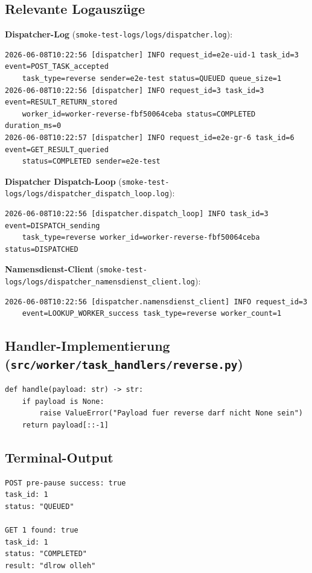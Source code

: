 \documentclass[a4paper,12pt]{article}
\begin{document}
\subsection*{Relevante Logauszüge}

\textbf{Dispatcher-Log} (\texttt{smoke-test-logs/logs/dispatcher.log}):
\begin{lstlisting}[style=log]
2026-06-08T10:22:56 [dispatcher] INFO request_id=e2e-uid-1 task_id=3 event=POST_TASK_accepted
    task_type=reverse sender=e2e-test status=QUEUED queue_size=1
2026-06-08T10:22:56 [dispatcher] INFO request_id=3 task_id=3 event=RESULT_RETURN_stored
    worker_id=worker-reverse-fbf50064ceba status=COMPLETED duration_ms=0
2026-06-08T10:22:57 [dispatcher] INFO request_id=e2e-gr-6 task_id=6 event=GET_RESULT_queried
    status=COMPLETED sender=e2e-test
\end{lstlisting}

\textbf{Dispatcher Dispatch-Loop} (\texttt{smoke-test-logs/logs/dispatcher\_dispatch\_loop.log}):
\begin{lstlisting}[style=log]
2026-06-08T10:22:56 [dispatcher.dispatch_loop] INFO task_id=3 event=DISPATCH_sending
    task_type=reverse worker_id=worker-reverse-fbf50064ceba status=DISPATCHED
\end{lstlisting}

\textbf{Namensdienst-Client} (\texttt{smoke-test-logs/logs/dispatcher\_namensdienst\_client.log}):
\begin{lstlisting}[style=log]
2026-06-08T10:22:56 [dispatcher.namensdienst_client] INFO request_id=3
    event=LOOKUP_WORKER_success task_type=reverse worker_count=1
\end{lstlisting}

\subsection*{Handler-Implementierung (\texttt{src/worker/task\_handlers/reverse.py})}

\begin{lstlisting}[style=python]
def handle(payload: str) -> str:
    if payload is None:
        raise ValueError("Payload fuer reverse darf nicht None sein")
    return payload[::-1]
\end{lstlisting}

\subsection*{Terminal-Output}

\begin{lstlisting}[style=log]
POST pre-pause success: true
task_id: 1
status: "QUEUED"

GET 1 found: true
task_id: 1
status: "COMPLETED"
result: "dlrow olleh"
\end{lstlisting}
\end{document}
